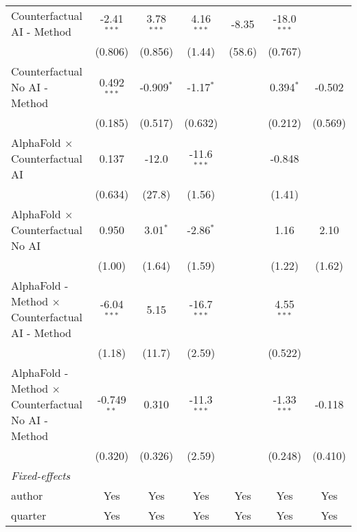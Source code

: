 \begin{tabular}{lcccccc}
   Counterfactual AI - Method                                 & -2.41$^{***}$ & 3.78$^{***}$  & 4.16$^{***}$  & -8.35   & -18.0$^{***}$ &   \\   
                                                              & (0.806)       & (0.856)       & (1.44)        & (58.6)  & (0.767)       &   \\   
   Counterfactual No AI - Method                              & 0.492$^{***}$ & -0.909$^{*}$  & -1.17$^{*}$   &         & 0.394$^{*}$   & -0.502\\   
                                                              & (0.185)       & (0.517)       & (0.632)       &         & (0.212)       & (0.569)\\   
   AlphaFold $\times$ Counterfactual AI                       & 0.137         & -12.0         & -11.6$^{***}$ &         & -0.848        &   \\   
                                                              & (0.634)       & (27.8)        & (1.56)        &         & (1.41)        &   \\   
   AlphaFold $\times$ Counterfactual No AI                    & 0.950         & 3.01$^{*}$    & -2.86$^{*}$   &         & 1.16          & 2.10\\   
                                                              & (1.00)        & (1.64)        & (1.59)        &         & (1.22)        & (1.62)\\   
   AlphaFold - Method $\times$ Counterfactual AI - Method     & -6.04$^{***}$ & 5.15          & -16.7$^{***}$ &         & 4.55$^{***}$  &   \\   
                                                              & (1.18)        & (11.7)        & (2.59)        &         & (0.522)       &   \\   
   AlphaFold - Method $\times$ Counterfactual No AI - Method  & -0.749$^{**}$ & 0.310         & -11.3$^{***}$ &         & -1.33$^{***}$ & -0.118\\   
                                                              & (0.320)       & (0.326)       & (2.59)        &         & (0.248)       & (0.410)\\   
   \midrule
   \emph{Fixed-effects}\\
   author                                                     & Yes           & Yes           & Yes           & Yes     & Yes           & Yes\\  
   quarter                                                    & Yes           & Yes           & Yes           & Yes     & Yes           & Yes\\  

\end{tabular}
